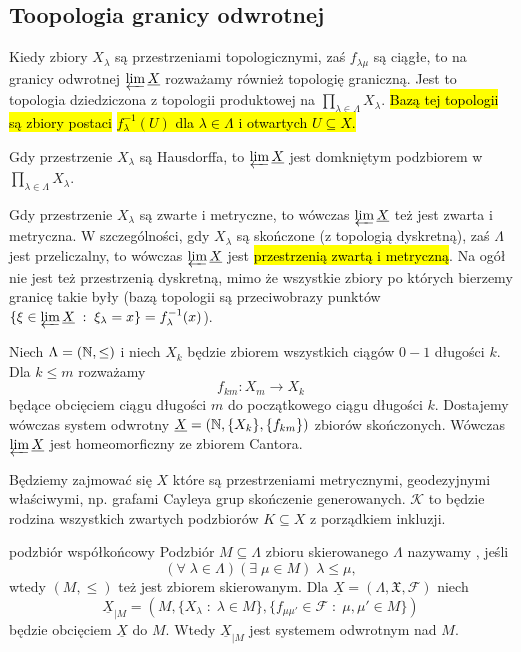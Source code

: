 \subsection{Toopologia granicy odwrotnej}

Kiedy zbiory $X_\lambda$ są przestrzeniami topologicznymi, zaś $f_{\lambda\mu}$ są ciągłe, to na granicy odwrotnej $\varprojlim\underline{X}$ rozważamy również topologię graniczną. Jest to topologia dziedziczona z topologii produktowej na $\prod_{\lambda\in\Lambda}X_\lambda$. \hl{Bazą tej topologii są zbiory postaci }\hl{$f_\lambda^{-1}(U)$ dla $\lambda\in\Lambda$ i otwartych $U\subseteq X$.}

\begin{fact}{}{}
  Gdy przestrzenie $X_\lambda$ są Hausdorffa, to $\varprojlim \underline{X}$ jest domkniętym podzbiorem w $\prod_{\lambda\in\Lambda}X_\lambda$.
\end{fact}

Gdy przestrzenie $X_\lambda$ są zwarte i metryczne, to wówczas $\varprojlim\underline{X}$ też jest zwarta i metryczna. W szczególności, gdy $X_\lambda$ są skończone (z topologią dyskretną), zaś $\Lambda$ jest przeliczalny, to wówczas $\varprojlim\underline{X}$ jest \hl{przestrzenią zwartą i metryczną}. Na ogół nie jest też przestrzenią dyskretną, mimo że wszystkie zbiory po których bierzemy granicę takie były (bazą topologii są przeciwobrazy punktów $\{\xi\in\varprojlim\underline{X}\;:\;\xi_\lambda=x\}=f^{-1}_\lambda(x)$).

\begin{example}{}{}
  Niech $\Lambda=(\mathbb{N}, \leq)$ i niech $X_k$ będzie zbiorem wszystkich ciągów $0-1$ długości $k$. Dla $k\leq m$ rozważamy 
  $$f_{km}:X_m\to X_k$$
  będące obcięciem ciągu długości $m$ do początkowego ciągu długości $k$. Dostajemy wówczas system odwrotny $\underline{X}=(\mathbb{N}, \{X_k\}, \{f_{km}\})$ zbiorów skończonych. Wówczas $\varprojlim\underline{X}$ jest homeomorficzny ze zbiorem Cantora.
\end{example}

Będziemy zajmować się $X$ które są przestrzeniami metrycznymi, geodezyjnymi właściwymi, np. grafami Cayleya grup skończenie generowanych. $\mathcal{K}$ to będzie rodzina wszystkich zwartych podzbiorów $K\subseteq X$ z porządkiem inkluzji.

\begin{definition}{podzbiór współkońcowy}{}
  Podzbiór $M\subseteq\Lambda$ zbioru skierowanego $\Lambda$ nazywamy , jeśli 
  $$(\forall\;\lambda\in\Lambda)(\exists\;\mu\in M)\;\lambda\leq\mu,$$ 
  wtedy $(M, \leq)$ też jest zbiorem skierowanym. Dla $\underline{X}=(\Lambda, \mathfrak{X}, \mathcal{F})$ niech 
  $$\underline{X}_{|M}=(M, \{X_\lambda\;:\;\lambda\in M\}, \{f_{\mu\mu'}\in\mathcal{F}\;:\;\mu,\mu'\in M\})$$
  będzie obcięciem $\underline{X}$ do $M$. Wtedy $\underline{X}_{|M}$ jest systemem odwrotnym nad $M$.
\end{definition}

